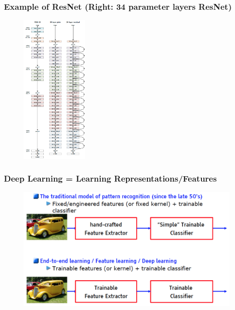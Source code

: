 \documentclass{beamer}
\begin{document}
\begin{frame}
\frametitle{Example of ResNet (Right: 34 parameter layers ResNet)}
\begin{figure}
      \includegraphics[width=0.3\textwidth]{figs/resnet.png}
\end{figure}
\end{frame}

\begin{frame}
\frametitle{Deep Learning = Learning Representations/Features}
\begin{figure}
      \includegraphics[width=1\textwidth]{figs/intro1.png}
\end{figure}
\end{frame}
\end{document}
